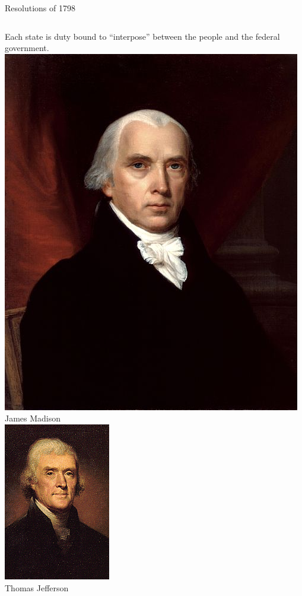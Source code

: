 \begin{frame}{Resolutions of 1798}
    \begin{columns}[c]
            \Large{Each state is duty bound to ``interpose'' between the people and the federal government.}
        \column{0.5\textheight}
            \centering
            \includegraphics[height=0.4\textheight]{img/madison.jpg} \\
            { \tiny James Madison \\ }
            \includegraphics[height=0.4\textheight]{img/jefferson.png} \\
            { \tiny Thomas Jefferson \\ }
    \end{columns}
\end{frame}

